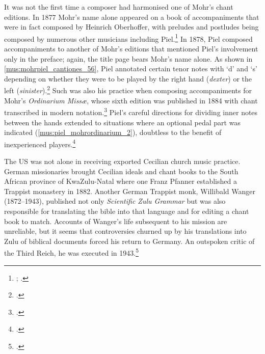 It was not the first time a composer had harmonised one of Mohr's chant editions.
In 1877 Mohr's name alone appeared on a book of accompaniments that were in fact composed by Heinrich Oberhoffer, with preludes and postludes being composed by numerous other musicians including Piel.\footnote{\covid{}\cite{MohrOrgelbegleitungCantate1877}; .}
In 1878, Piel composed accompaniments to another of Mohr's editions that mentioned Piel's involvement only in the preface; again, the title page bears Mohr's name alone.
As shown in \cref{mus:mohrpiel_cantiones_56}, Piel annotated certain tenor notes with `d' and `s' depending on whether they were to be played by the right hand (\emph{dexter}) or the left (\emph{sinister}).\footcites[A description of `d' and `s' is provided in][233--4]{Directoriumchoriad1874}[See also][unpaginated `Preface' and p.~56]{MohrCantionessacraeCollection1878}
Such was also his practice when composing accompaniments for Mohr's \emph{Ordinarium Missæ}, whose sixth edition was published in 1884 with chant transcribed in modern notation.\footcite[3 and \emph{passim}]{MohrOrdinariumMissaesive1884}
Piel's careful directions for dividing inner notes between the hands extended to situations where an optional pedal part was indicated (\cref{mus:piel_mohrordinarium_2}), doubtless to the benefit of inexperienced players.\footcite[unpaginated `Vorrede' and p.~2]{MohrOrgelbegleitungMessbuechleinund1888}

The US was not alone in receiving exported Cecilian church music practice.
German missionaries brought Cecilian ideals and chant books to the South African province of KwaZulu-Natal where one Franz Pfanner established a Trappist monastery in 1882.
Another German Trappist monk, Willibald Wanger (1872--1943), published not only \emph{Scientific Zulu Grammar} but was also responsible for translating the bible into that language and for editing a chant book to match.
Accounts of Wanger's life subsequent to his mission are unreliable, but it seems that controversies churned up by his translations into Zulu of biblical documents forced his return to Germany.
An outspoken critic of the Third Reich, he was executed in 1943.\footcites[410]{BallingApostleSouthAfrica2016}[The date of Wanger's death is reported as 1944 in][p. 244 n.~21]{HaggardDiaryAfricanJourney2000}


